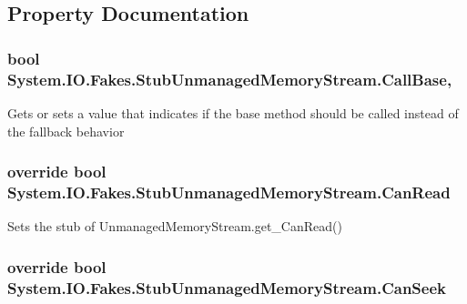 \subsection{Property Documentation}
\hypertarget{class_system_1_1_i_o_1_1_fakes_1_1_stub_unmanaged_memory_stream_a76a58ad918568f2e8b445c059a3e084d}{
\subsubsection[{Call\-Base}]{\setlength{\rightskip}{0pt plus 5cm}bool System.\-I\-O.\-Fakes.\-Stub\-Unmanaged\-Memory\-Stream.\-Call\-Base\hspace{0.3cm}{\ttfamily [get]}, {\ttfamily [set]}}}\label{class_system_1_1_i_o_1_1_fakes_1_1_stub_unmanaged_memory_stream_a76a58ad918568f2e8b445c059a3e084d}


Gets or sets a value that indicates if the base method should be called instead of the fallback behavior

\hypertarget{class_system_1_1_i_o_1_1_fakes_1_1_stub_unmanaged_memory_stream_af344841ffe32d7f8ca39aa77817e6c2d}{
\subsubsection[{Can\-Read}]{\setlength{\rightskip}{0pt plus 5cm}override bool System.\-I\-O.\-Fakes.\-Stub\-Unmanaged\-Memory\-Stream.\-Can\-Read\hspace{0.3cm}{\ttfamily [get]}}}\label{class_system_1_1_i_o_1_1_fakes_1_1_stub_unmanaged_memory_stream_af344841ffe32d7f8ca39aa77817e6c2d}


Sets the stub of Unmanaged\-Memory\-Stream.\-get\-\_\-\-Can\-Read()

\hypertarget{class_system_1_1_i_o_1_1_fakes_1_1_stub_unmanaged_memory_stream_a6f47ed351d5c030801c04cf4744167d8}{
\subsubsection[{Can\-Seek}]{\setlength{\rightskip}{0pt plus 5cm}override bool System.\-I\-O.\-Fakes.\-Stub\-Unmanaged\-Memory\-Stream.\-Can\-Seek\hspace{0.3cm}{\ttfamily [get]}}}\label{class_system_1_1_i_o_1_1_fakes_1_1_stub_unmanaged_memory_stream_a6f47ed351d5c030801c04cf4744167d8}


